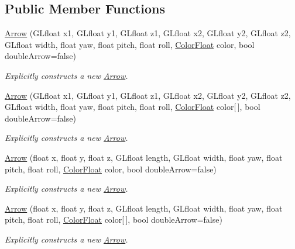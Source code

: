 \subsection*{Public Member Functions}
\begin{DoxyCompactItemize}
\item 
\hyperlink{classtsgl_1_1_arrow_a86e18cde9d0863fcb64ae7cdf0f6ddd1}{Arrow} (G\+Lfloat x1, G\+Lfloat y1, G\+Lfloat z1, G\+Lfloat x2, G\+Lfloat y2, G\+Lfloat z2, G\+Lfloat width, float yaw, float pitch, float roll, \hyperlink{structtsgl_1_1_color_float}{Color\+Float} color, bool double\+Arrow=false)
\begin{DoxyCompactList}\small\item\em Explicitly constructs a new \hyperlink{classtsgl_1_1_arrow}{Arrow}. \end{DoxyCompactList}\item 
\hyperlink{classtsgl_1_1_arrow_a44bf3a837e2f9c7b95673a1f9d9c2743}{Arrow} (G\+Lfloat x1, G\+Lfloat y1, G\+Lfloat z1, G\+Lfloat x2, G\+Lfloat y2, G\+Lfloat z2, G\+Lfloat width, float yaw, float pitch, float roll, \hyperlink{structtsgl_1_1_color_float}{Color\+Float} color\mbox{[}$\,$\mbox{]}, bool double\+Arrow=false)
\begin{DoxyCompactList}\small\item\em Explicitly constructs a new \hyperlink{classtsgl_1_1_arrow}{Arrow}. \end{DoxyCompactList}\item 
\hyperlink{classtsgl_1_1_arrow_ad084fce4677958a3211cea0bd94aab69}{Arrow} (float x, float y, float z, G\+Lfloat length, G\+Lfloat width, float yaw, float pitch, float roll, \hyperlink{structtsgl_1_1_color_float}{Color\+Float} color, bool double\+Arrow=false)
\begin{DoxyCompactList}\small\item\em Explicitly constructs a new \hyperlink{classtsgl_1_1_arrow}{Arrow}. \end{DoxyCompactList}\item 
\hyperlink{classtsgl_1_1_arrow_adf3dc30a25b7094b25370455c1a86682}{Arrow} (float x, float y, float z, G\+Lfloat length, G\+Lfloat width, float yaw, float pitch, float roll, \hyperlink{structtsgl_1_1_color_float}{Color\+Float} color\mbox{[}$\,$\mbox{]}, bool double\+Arrow=false)
\begin{DoxyCompactList}\small\item\em Explicitly constructs a new \hyperlink{classtsgl_1_1_arrow}{Arrow}. \end{DoxyCompactList}\item 

\end{DoxyCompactItemize}
